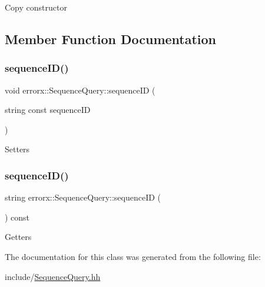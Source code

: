 Copy constructor 

\subsection{Member Function Documentation}
\mbox{\label{classerrorx_1_1_sequence_query_a29c9365ac24b4f46391564b491592394}} 
\subsubsection{\texorpdfstring{sequence\+I\+D()}{sequenceID()}\hspace{0.1cm}{\footnotesize\ttfamily [1/2]}}
{\footnotesize\ttfamily void errorx\+::\+Sequence\+Query\+::sequence\+ID (\begin{DoxyParamCaption}\item[{string const}]{sequence\+ID }\end{DoxyParamCaption})}

Setters \mbox{\label{classerrorx_1_1_sequence_query_abd2a1128dbdee2be603d130f368bfa32}} 
\subsubsection{\texorpdfstring{sequence\+I\+D()}{sequenceID()}\hspace{0.1cm}{\footnotesize\ttfamily [2/2]}}
{\footnotesize\ttfamily string errorx\+::\+Sequence\+Query\+::sequence\+ID (\begin{DoxyParamCaption}{ }\end{DoxyParamCaption}) const}

Getters 

The documentation for this class was generated from the following file\+:\begin{DoxyCompactItemize}
\item 
include/\mbox{\hyperlink{_sequence_query_8hh}{Sequence\+Query.\+hh}}\end{DoxyCompactItemize}
